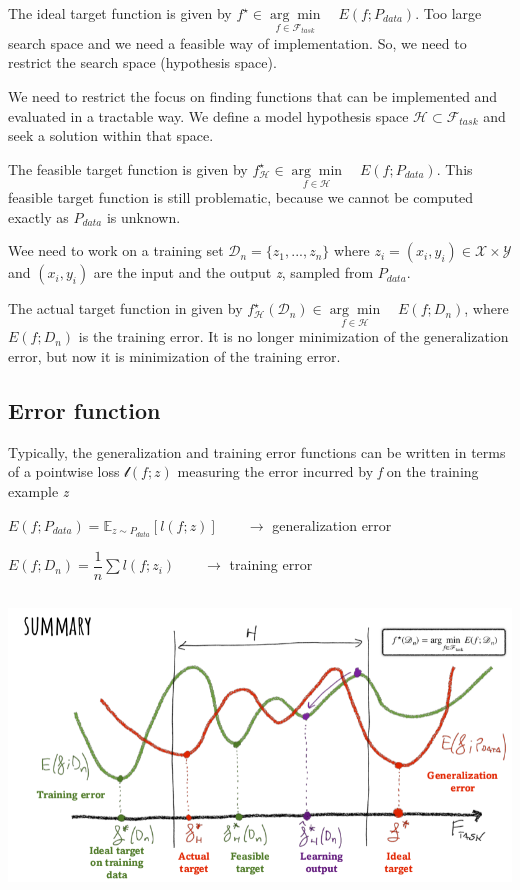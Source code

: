 \documentclass{article}
\begin{document}
\bigskip

The ideal target function is given by \(f^\star \in \underset{f \in \mathcal{F}_{task}}{\arg\min} \quad E(f; P_{data})\). Too large search space and we need a feasible way of implementation. So, we need to restrict the search space (hypothesis space).
\bigskip


We need to restrict the focus on finding functions that can be implemented and evaluated in a tractable way. We define a model hypothesis space \(\mathcal{H} \subset \mathcal{F}_{task}\) and seek a solution within that space.

The feasible target function is given by \(f^{\star}_{\mathcal{H}} \in \underset{f \in \mathcal{H}}{\arg\min} \quad E(f; P_{data})\). This feasible target function is still problematic, because we cannot be computed exactly as \(P_{data}\) is unknown.

\bigskip

	
Wee need to work on a training set \(\mathcal{D}_n = \{z_1, ..., z_n\}\) where \(z_i = (x_i, y_i) \in \mathcal{X} \times \mathcal{Y}\) and \((x_i, y_i)\) are the input and the output \emph{z}, sampled from \(P_{data}\).

The actual target function in given by \(f^{\star}_{\mathcal{H}}(\mathcal{D}_n) \in \underset{f \in \mathcal{H}}{\arg\min} \quad E(f; D_n)\), where \(E(f; D_n)\) is the training error. It is no longer minimization of the generalization error, but now it is minimization of the training error.


\subsection*{Error function}

Typically, the generalization and training error functions can be written in terms of a pointwise loss \(\mathcal{l}(f;z)\) measuring the error incurred by \emph{f} on the training example \emph{z}

\(E(f; P_{data}) = \mathbb{E}_{z\sim P_{data}} [l(f;z)] \qquad\longrightarrow\) generalization error


\(E(f; D_n) = \dfrac{1}{n} \sum l(f; z_i) \qquad \longrightarrow\) training error

\includegraphics[width=15cm, height=8cm]{img/summary2.png}
\end{document}
